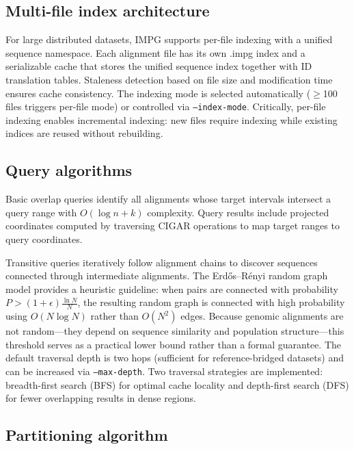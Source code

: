 \subsection*{Multi-file index architecture}

For large distributed datasets, IMPG supports per-file indexing with a unified sequence namespace. Each alignment file has its own .impg index and a serializable cache that stores the unified sequence index together with ID translation tables. Staleness detection based on file size and modification time ensures cache consistency. The indexing mode is selected automatically ($\geq$100 files triggers per-file mode) or controlled via \texttt{--index-mode}. Critically, per-file indexing enables incremental indexing: new files require indexing while existing indices are reused without rebuilding.

\subsection*{Query algorithms}

Basic overlap queries identify all alignments whose target intervals intersect a query range with $O(\log n + k)$ complexity. Query results include projected coordinates computed by traversing CIGAR operations to map target ranges to query coordinates.

Transitive queries iteratively follow alignment chains to discover sequences connected through intermediate alignments. The Erd\H{o}s--R\'enyi random graph model \cite{erdos1959random} provides a heuristic guideline: when pairs are connected with probability $P > (1+\epsilon) \frac{\ln N}{N}$, the resulting random graph is connected with high probability using $O(N \log N)$ rather than $O(N^2)$ edges. Because genomic alignments are not random---they depend on sequence similarity and population structure---this threshold serves as a practical lower bound rather than a formal guarantee. The default traversal depth is two hops (sufficient for reference-bridged datasets) and can be increased via \texttt{--max-depth}. Two traversal strategies are implemented: breadth-first search (BFS) for optimal cache locality and depth-first search (DFS) for fewer overlapping results in dense regions.

\subsection*{Partitioning algorithm}

